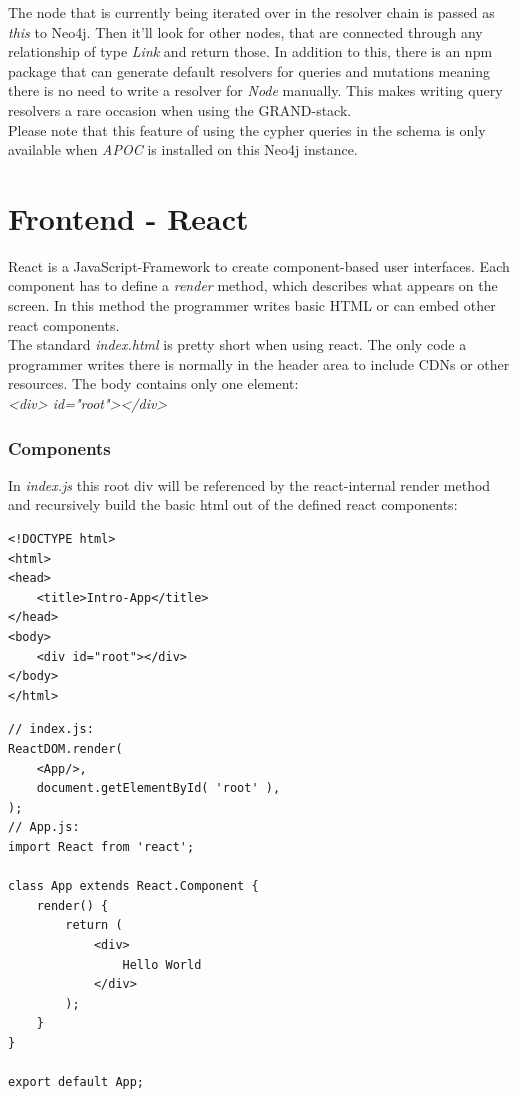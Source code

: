 The node that is currently being iterated over in the resolver chain is passed as \emph{this} to Neo4j. Then it'll look for other nodes, that are connected through any relationship of type \emph{Link} and return those. In addition to this, there is an npm package that can generate default resolvers for queries and mutations meaning there is no need to write a resolver for \emph{Node} manually. This makes writing query resolvers a rare occasion when using the GRAND-stack. \\

Please note that this feature of using the cypher queries in the schema is only available when \emph{APOC} is installed on this Neo4j instance.

\section{Frontend - React}
React is a JavaScript-Framework to create component-based user interfaces. Each component has to define a \emph{render} method, which describes what appears on the screen. In this method the programmer writes basic HTML or can embed other react components. \\
The standard \emph{index.html} is pretty short when using react. The only code a programmer writes there is normally in the header area to include CDNs or other resources. The body contains only one element: \\
\emph{<div> id="root"></div>} 

\subsubsection{Components}
In \emph{index.js} this root div will be referenced by the react-internal render method and recursively build the basic html out of the defined react components:
\lstset{language=HTML}
\begin{lstlisting}[caption={index.html for Hello World},label={ex250}]
<!DOCTYPE html>
<html>
<head>
	<title>Intro-App</title>
</head>
<body>
	<div id="root"></div>
</body>
</html>
\end{lstlisting}

\lstset{language=JavaScript}
\begin{lstlisting}[caption={Hello World in React},label={ex251}]
// index.js:
ReactDOM.render(
	<App/>,
	document.getElementById( 'root' ),
);
// App.js:
import React from 'react';

class App extends React.Component {
	render() {
		return (
			<div>
				Hello World
			</div>
		);
	}
}

export default App;
\end{lstlisting}


